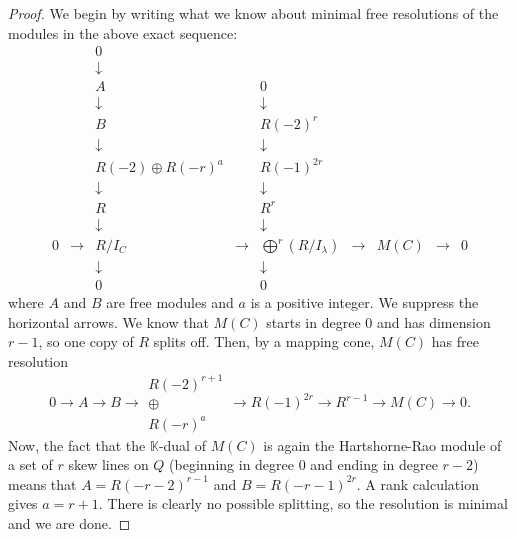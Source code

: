 \documentclass[12pt]{amsart}%
\numberwithin{equation}{section}
\theoremstyle{definition}
\numberwithin{equation}{section}
\begin{document}
\begin{proof}
We begin by writing what we know about minimal free resolutions of the modules in the above exact sequence:
\[
\begin{array}{cccccccccccc}
&& 0 \\
&& \downarrow \\
&& A && 0 \\
&& \downarrow && \downarrow \\
&& B && R(-2)^r \\
&& \downarrow && \downarrow \\
&& R(-2) \oplus R(-r)^a && R(-1)^{2r} \\
&& \downarrow && \downarrow \\
&& R && R^r \\
&& \downarrow && \downarrow \\
0 & \rightarrow & R/I_C & \rightarrow & \bigoplus^r (R/I_\lambda) & \rightarrow & M(C) & \rightarrow & 0 \\
&& \downarrow && \downarrow \\
&& 0 && 0
\end{array}
\]
where $A$ and $B$ are free modules and $a$ is a positive integer. We suppress the horizontal arrows. We know that $M(C)$ starts in degree 0 and has dimension $r-1$, so one copy of $R$ splits off. Then, by a mapping cone, $M(C)$ has free resolution
\[
0 \rightarrow A \rightarrow B \rightarrow 
\begin{array}{c}
R(-2)^{r+1} \\
\oplus \\
R(-r)^a
\end{array}
\rightarrow R(-1)^{2r} \rightarrow R^{r-1} \rightarrow M(C) \rightarrow 0.
\]
Now, the fact that the $\mathbb K$-dual of $M(C)$ is again the Hartshorne-Rao module of a set of $r$ skew lines  on $Q$ (beginning in degree 0 and ending in degree $r-2$) means that $A = R(-r-2)^{r-1}$ and $B = R(-r-1)^{2r}$. A rank calculation gives $a = r+1$. There is clearly no possible splitting, so the resolution is minimal and we are done.
\end{proof}
\end{document}
